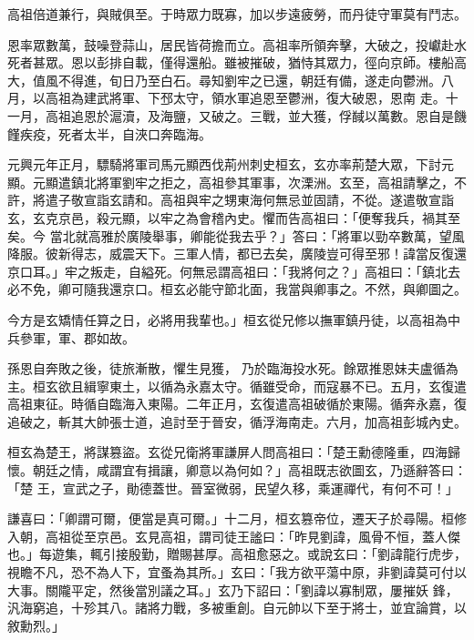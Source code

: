 \begin{pinyinscope}
 高祖倍道兼行，與賊俱至。于時眾力既寡，加以步遠疲勞，而丹徒守軍莫有鬥志。



 恩率眾數萬，鼓噪登蒜山，居民皆荷擔而立。高祖率所領奔擊，大破之，投巘赴水死者甚眾。恩以彭排自載，僅得還船。雖被摧破，猶恃其眾力，徑向京師。樓船高大，值風不得進，旬日乃至白石。尋知劉牢之已還，朝廷有備，遂走向鬱洲。八月，以高祖為建武將軍、下邳太守，領水軍追恩至鬱洲，復大破恩，恩南
 走。十一月，高祖追恩於滬瀆，及海鹽，又破之。三戰，並大獲，俘馘以萬數。恩自是饑饉疾疫，死者太半，自浹口奔臨海。



 元興元年正月，驃騎將軍司馬元顯西伐荊州刺史桓玄，玄亦率荊楚大眾，下討元顯。元顯遣鎮北將軍劉牢之拒之，高祖參其軍事，次溧洲。玄至，高祖請擊之，不許，將遣子敬宣詣玄請和。高祖與牢之甥東海何無忌並固請，不從。遂遣敬宣詣玄，玄克京邑，殺元顯，以牢之為會稽內史。懼而告高祖曰：「便奪我兵，禍其至矣。今
 當北就高雅於廣陵舉事，卿能從我去乎？」答曰：「將軍以勁卒數萬，望風降服。彼新得志，威震天下。三軍人情，都已去矣，廣陵豈可得至邪！諱當反復還京口耳。」牢之叛走，自縊死。何無忌謂高祖曰：「我將何之？」高祖曰：「鎮北去必不免，卿可隨我還京口。桓玄必能守節北面，我當與卿事之。不然，與卿圖之。



 今方是玄矯情任算之日，必將用我輩也。」桓玄從兄修以撫軍鎮丹徒，以高祖為中兵參軍，軍、郡如故。



 孫恩自奔敗之後，徒旅漸散，懼生見獲，
 乃於臨海投水死。餘眾推恩妹夫盧循為主。桓玄欲且緝寧東土，以循為永嘉太守。循雖受命，而寇暴不已。五月，玄復遣高祖東征。時循自臨海入東陽。二年正月，玄復遣高祖破循於東陽。循奔永嘉，復追破之，斬其大帥張士道，追討至于晉安，循浮海南走。六月，加高祖彭城內史。



 桓玄為楚王，將謀篡盜。玄從兄衛將軍謙屏人問高祖曰：「楚王勳德隆重，四海歸懷。朝廷之情，咸謂宜有揖讓，卿意以為何如？」高祖既志欲圖玄，乃遜辭答曰：「楚
 王，宣武之子，勛德蓋世。晉室微弱，民望久移，乘運禪代，有何不可！」



 謙喜曰：「卿謂可爾，便當是真可爾。」十二月，桓玄篡帝位，遷天子於尋陽。桓修入朝，高祖從至京邑。玄見高祖，謂司徒王謐曰：「昨見劉諱，風骨不恒，蓋人傑也。」每遊集，輒引接殷勤，贈賜甚厚。高祖愈惡之。或說玄曰：「劉諱龍行虎步，視瞻不凡，恐不為人下，宜蚤為其所。」玄曰：「我方欲平蕩中原，非劉諱莫可付以大事。關隴平定，然後當別議之耳。」玄乃下詔曰：「劉諱以寡制眾，屢摧妖
 鋒，汎海窮追，十殄其八。諸將力戰，多被重創。自元帥以下至于將士，並宜論賞，以敘勳烈。」




\end{pinyinscope}
